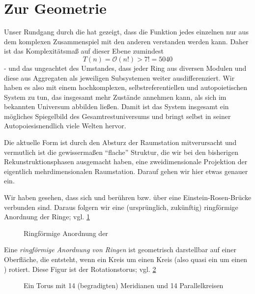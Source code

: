 \section*{Zur Geometrie}\label{sec:fazit}
\fancyhead[LO]{}

Unser Rundgang durch die  hat gezeigt, dass die Funktion jedes einzelnen  nur aus dem komplexen Zusammenspiel mit den anderen  verstanden werden kann. Daher ist das Komplexitätsmaß auf dieser Ebene zumindest
\begin{equation}
    T(n) = \mathcal{O} (n!) > 7! = 5040
\end{equation}
- und das ungeachtet des Umstandes, dass jeder Ring aus diversen Modulen und diese aus Aggregaten als jeweiligen Subsystemen weiter ausdifferenziert. Wir haben es also mit einem hochkomplexen, selbstreferentiellen und autopoietischen System zu tun, das insgesamt mehr Zustände annehmen kann, als sich im bekannten Universum abbilden ließen. Damit ist das System insgesamt ein mögliches Spiegelbild des Gesamtrestuniversums und bringt selbst in seiner Autopoiesisnendlich viele Welten hervor.


Die aktuelle Form ist durch den Absturz der Raumstation mitverursacht und vermutlich ist die gewissermaßen "`flache"' Struktur, die wir bei den bisherigen Rekunstruktionsphasen ausgemacht haben, eine zweidimensionale Projektion der eigentlich mehrdimensionalen Raumstation. Darauf gehen wir hier etwas genauer ein.

Wir haben gesehen, dass sich  und  berühren bzw. über eine Einstein-Rosen-Brücke verbunden sind. Daraus folgern wir eine (ursprünglich, zukünftig) ringförmige Anordnung der Ringe; vgl. \cref{fig:ringring}

\begin{figure}[ht!]
    \centering
    
    \caption{Ringförmige Anordnung der }
    \label{fig:ringring}
\end{figure}

Eine \emph{ringförmige Anordnung von Ringen }ist geometrisch darstellbar auf einer Oberfläche, die entsteht, wenn ein Kreis um einen Kreis (also quasi ein  um einen ) rotiert. Diese Figur ist der Rotationstorus; vgl. \cref{fig:torusweiss}

\begin{figure}[ht!]
    \centering
    
    \caption{Ein Torus mit 14 (begradigten) Meridianen  und 14 Parallelkreisen}
    \label{fig:torusweiss}
\end{figure}


